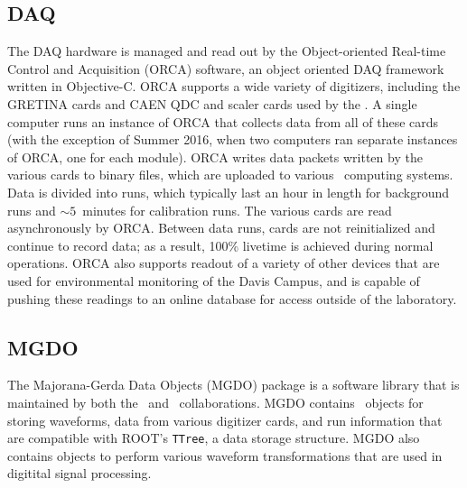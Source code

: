 \documentclass[/main.tex]{subfiles}
\begin{document}
\subsection{DAQ}
The DAQ hardware is managed and read out by the Object-oriented Real-time Control and Acquisition (ORCA) software, an object oriented DAQ framework written in Objective-C\cite{orca}.
ORCA supports a wide variety of digitizers, including the GRETINA cards and CAEN QDC and scaler cards used by the \MJD.
A single computer runs an instance of ORCA that collects data from all of these cards (with the exception of Summer 2016, when two computers ran separate instances of ORCA, one for each module).
ORCA writes data packets written by the various cards to binary files, which are uploaded to various \MJD\ computing systems.
Data is divided into runs, which typically last an hour in length for background runs and ${\sim}5$~minutes for calibration runs.
The various cards are read asynchronously by ORCA.
Between data runs, cards are not reinitialized and continue to record data; as a result, 100\% livetime is achieved during normal operations.
ORCA also supports readout of a variety of other devices that are used for environmental monitoring of the Davis Campus, and is capable of pushing these readings to an online database for access outside of the laboratory.

\subsection{MGDO}
The Majorana-Gerda Data Objects (MGDO) package is a software library that is maintained by both the \MJ\ and \Gerda\ collaborations\cite{mgdo}.
MGDO contains \cpp\ objects for storing waveforms, data from various digitizer cards, and run information that are compatible with ROOT's \texttt{TTree}, a data storage structure.
MGDO also contains objects to perform various waveform transformations that are used in digitital signal processing.
\end{document}

